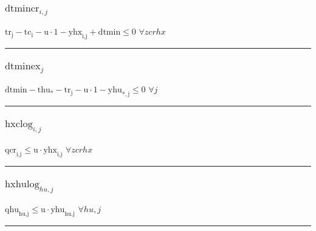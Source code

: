 \documentclass[11pt]{article}
\begin{document}
\subsubsection*{\begin{math}\text{dtmincr}_{i,j}\end{math}}
\begin{math}
\text{tr}_{\text{j}} - \text{tc}_{\text{i}} - \text{u} \cdot 1 - \text{yhx}_{\text{i},\text{j}} + \text{dtmin} \leq 0
\end{math}
\hfill
\begin{math}
\forall zcrhx
\end{math}\vspace{5pt}
\hrule
\subsubsection*{\begin{math}\text{dtminex}_{j}\end{math}}
\begin{math}
\text{dtmin} - \text{thu}_{*} - \text{tr}_{\text{j}} - \text{u} \cdot 1 - \text{yhu}_{*,\text{j}} \leq 0
\end{math}
\hfill
\begin{math}
\forall j
\end{math}\vspace{5pt}
\hrule
\subsubsection*{\begin{math}\text{hxclog}_{i,j}\end{math}}
\begin{math}
\text{qcr}_{\text{i},\text{j}} \leq \text{u} \cdot \text{yhx}_{\text{i},\text{j}}
\end{math}
\hfill
\begin{math}
\forall zcrhx
\end{math}\vspace{5pt}
\hrule
\subsubsection*{\begin{math}\text{hxhulog}_{hu,j}\end{math}}
\begin{math}
\text{qhu}_{\text{hu},\text{j}} \leq \text{u} \cdot \text{yhu}_{\text{hu},\text{j}}
\end{math}
\hfill
\begin{math}
\forall hu,j
\end{math}\vspace{5pt}
\hrule
\end{document}
